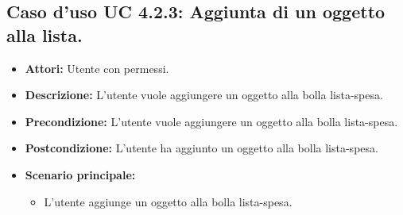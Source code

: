 \subsection{Caso d'uso UC 4.2.3: Aggiunta di un oggetto alla lista.}
\label{Caso d'uso UC 4.2.3: Aggiunta di un oggetto alla lista.}

\FloatBarrier
\begin{itemize}
\item \textbf{Attori:} Utente con permessi.
\item \textbf{Descrizione:} L'utente vuole aggiungere un oggetto alla bolla lista-spesa.
\item \textbf{Precondizione:} L'utente vuole aggiungere un oggetto alla bolla lista-spesa. 
\item \textbf{Postcondizione:} L'utente ha aggiunto un oggetto alla bolla lista-spesa.
\item \textbf{Scenario principale:}
	\begin{itemize}
	\item{L'utente aggiunge un oggetto alla bolla lista-spesa.}
	\end{itemize}
\end{itemize}